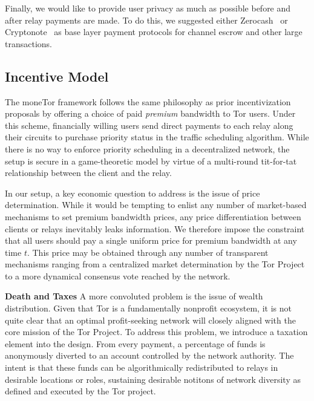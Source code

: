 Finally, we would like to provide user privacy as much as possible before and
after relay payments are made. To do this, we suggested either
Zerocash~\cite{sasson2014zerocash} or Cryptonote~\cite{van2013cryptonote} as
base layer payment protocols for channel escrow and other large transactions.

\subsection{Incentive Model}
The moneTor framework follows the same philosophy as prior incentivization
proposals by offering a choice of paid \emph{premium} bandwidth to Tor
users. Under this scheme, financially willing users send direct payments to each
relay along their circuits to purchase priority status in the traffic scheduling
algorithm. While there is no way to enforce priority scheduling in a
decentralized network, the setup is secure in a game-theoretic model by virtue
of a multi-round tit-for-tat relationship between the client and the relay.

In our setup, a key economic question to address is the issue of price
determination. While it would be tempting to enlist any number of market-based
mechanisms to set premium bandwidth prices, any price differentiation between
clients or relays inevitably leaks information. We therefore impose the
constraint that all users should pay a single uniform price for premium
bandwidth at any time $t$. This price may be obtained through any number of
transparent mechanisms ranging from a centralized market determination by the
Tor Project to a more dynamical consensus vote reached by the network.

\textbf{Death and Taxes} A more convoluted problem is the issue of wealth
distribution. Given that Tor is a fundamentally nonprofit ecosystem, it is not
quite clear that an optimal profit-seeking network will closely aligned with the
core mission of the Tor Project. To address this problem, we introduce a
taxation element into the design. From every payment, a percentage of funds is
anonymously diverted to an account controlled by the network authority. The
intent is that these funds can be algorithmically redistributed to relays in
desirable locations or roles, sustaining desirable notitons of network diversity
as defined and executed by the Tor project.
